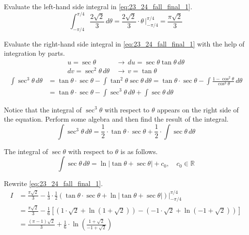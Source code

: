 \documentclass[a4paper, 12pt]{article}
\begin{document}
\begin{enumerate}[leftmargin=*,label=\textbf{\arabic*.}]
\begin{enumerate}[leftmargin=*,label=\textbf{\alph*.}]
Evaluate the left-hand side integral in \eqref{eq:23_24_fall_final_1}.
\[\int_{-\pi/4}^{\pi/4}\frac{2\sqrt2}3\,d\theta=\frac{2\sqrt2}3\cdot\theta\,\bigg|_{-\pi/4}^{\pi/4}=\frac{\pi\sqrt2}3\]

Evaluate the right-hand side integral in \eqref{eq:23_24_fall_final_1} with the help of integration by parts.
\begin{align*}u=\sec\theta\,&\rightarrow\,du=\sec\theta\tan\theta\,d\theta\\dv=\sec^2\theta\,d\theta\,&\rightarrow\,v=\tan\theta\end{align*}
\begin{align*}
\int\sec^3\theta\,d\theta&=\tan\theta\cdot\sec\theta-\int\tan^2\theta\sec\theta\,d\theta=\tan\theta\cdot\sec\theta-\int\frac{1-\cos^2\theta}{\cos^3\theta}\,d\theta\\[1em]&=\tan\theta\cdot\sec\theta-\int\sec^3\theta\,d\theta+\int\sec\theta\,d\theta
\end{align*}

Notice that the integral of $\sec^3\theta$ with respect to $\theta$ appears on the right side of the equation. Perform some algebra and then find the result of the integral.
\begin{equation*}\int\sec^3\theta\,d\theta=\frac12\cdot\tan\theta\cdot\sec\theta+\frac12\cdot\int\sec\theta\,d\theta\end{equation*}

The integral of $\sec\theta$ with respect to $\theta$ is as follows.
\begin{equation*}\int\sec\theta\,d\theta=\ln\left|\tan\theta+\sec\theta\right|+c_0,\quad c_0\in\mathbb{R}\end{equation*}

Rewrite \eqref{eq:23_24_fall_final_1}.
\begin{align*}{I}&=\frac{\pi\sqrt2}3-\frac13\cdot\frac12\left(\tan\theta\cdot\sec\theta+\ln\left|\tan\theta+\sec\theta\right|\right)\bigg|_{-\pi/4}^{\pi/4}\\[1em]&=\frac{\pi\sqrt2}3-\frac16\left[\left(1\cdot\sqrt2+\ln\left(1+\sqrt2\right)\right)-\left(-1\cdot\sqrt2+\ln\left(-1+\sqrt2\right)\right)\right]\\[1em]&=\boxed{\frac{(\pi-1)\sqrt2}3+\frac16\cdot\ln\left(\frac{1+\sqrt2}{-1+\sqrt2}\right)}\end{align*}
\end{enumerate}


\end{enumerate}
\end{document}
